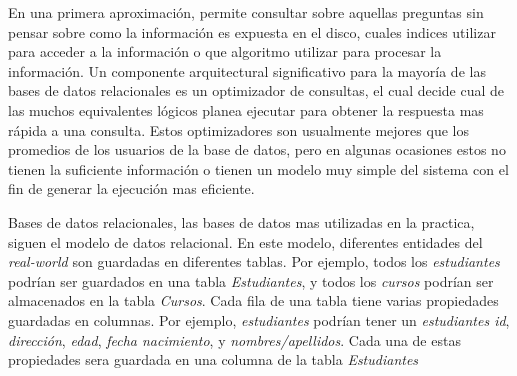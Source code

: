 En una primera aproximación,  permite consultar sobre aquellas preguntas sin pensar sobre como la información es expuesta en el disco, cuales indices utilizar para acceder a la información o que algoritmo utilizar para procesar la información. Un componente arquitectural significativo para la mayoría de las bases de datos relacionales es un optimizador de consultas, el cual decide cual de las muchos equivalentes lógicos planea ejecutar para obtener la respuesta mas rápida a una consulta. Estos optimizadores son usualmente mejores que los promedios de los usuarios de la base de datos, pero en algunas ocasiones estos no tienen la suficiente información o tienen un modelo muy simple del sistema con el fin de generar la ejecución mas eficiente.

Bases de datos relacionales, las bases de datos mas utilizadas en la practica, siguen el modelo de datos relacional. En este modelo, diferentes entidades del \textit{real-world} son guardadas en diferentes tablas. Por ejemplo, todos los \textit{estudiantes} podrían ser guardados en una tabla \textit{Estudiantes}, y todos los \textit{cursos} podrían ser almacenados en la tabla \textit{Cursos}. Cada fila de una tabla tiene varias propiedades guardadas en columnas. Por ejemplo, \textit{estudiantes} podrían tener un \textit{estudiantes id}, \textit{dirección}, \textit{edad},  \textit{fecha nacimiento}, y \textit{nombres/apellidos}. Cada una de estas propiedades sera guardada en una columna de la tabla \textit{Estudiantes}


